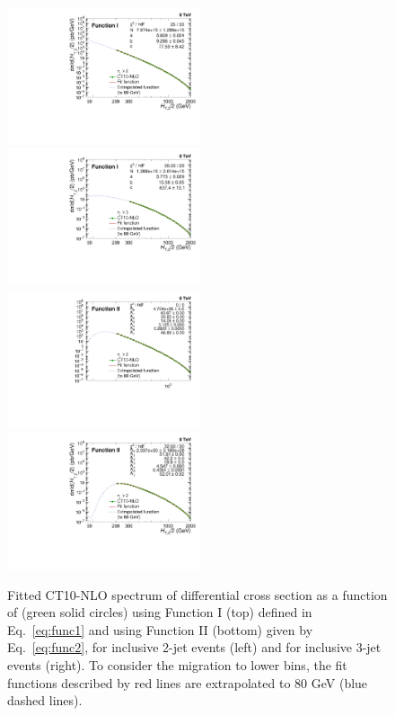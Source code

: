 \begin{figure}[h]
  \begin{center}
    \includegraphics[width=0.51\textwidth]{Plots_HT_2_150/Extrapolate_Theory_2_HT_2_150_funcI.pdf}%
    ~~\includegraphics[width=0.51\textwidth]{Plots_HT_2_150/Extrapolate_Theory_3_HT_2_150_funcI.pdf}\\
    \vspace{5mm}
    \includegraphics[width=0.51\textwidth]{Plots_HT_2_150/Extrapolate_Theory_2_HT_2_150_funcII.pdf}%
    ~~\includegraphics[width=0.51\textwidth]{Plots_HT_2_150/Extrapolate_Theory_3_HT_2_150_funcII.pdf}\\
    \caption{Fitted CT10-NLO spectrum of differential cross section as a function of \httwo (green solid circles) using Function I (top) defined in Eq.~\ref{eq:func1} and using Function II (bottom) given by Eq.~\ref{eq:func2}, for inclusive 2-jet events (left) and for inclusive 3-jet events (right). To consider the migration to lower \httwo bins, the fit functions described by red lines are extrapolated to 80 GeV (blue dashed lines).}
    \label{fig:fit}
  \end{center}
\end{figure}

